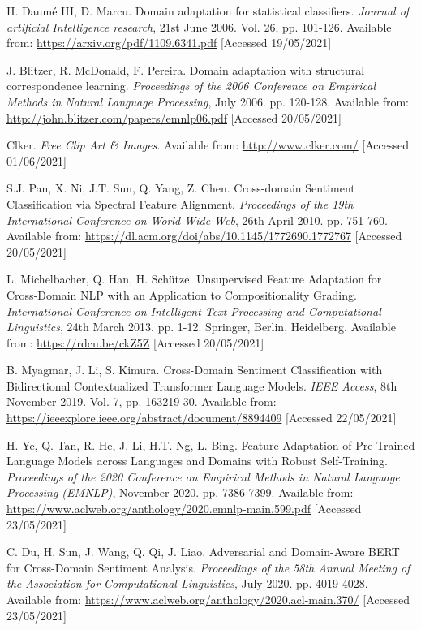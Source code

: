 \begin{thebibliography}{9}
H. Daumé III, D. Marcu. Domain adaptation for statistical classifiers. \textit{Journal of artificial Intelligence research}, 21st June 2006. Vol. 26, pp. 101-126. Available from: \url{https://arxiv.org/pdf/1109.6341.pdf} [Accessed 19/05/2021]

J. Blitzer, R. McDonald, F. Pereira. Domain adaptation with structural correspondence learning. \textit{Proceedings of the 2006 Conference on Empirical Methods in Natural Language Processing}, July 2006. pp. 120-128. Available from: \url{http://john.blitzer.com/papers/emnlp06.pdf} [Accessed 20/05/2021]

Clker. \textit{Free Clip Art \& Images}. Available from: \url{http://www.clker.com/} [Accessed 01/06/2021]

S.J. Pan, X. Ni, J.T. Sun, Q. Yang, Z. Chen. Cross-domain Sentiment Classification via Spectral Feature Alignment. \textit{Proceedings of the 19th International Conference on World Wide Web}, 26th April 2010. pp. 751-760. Available from: \url{https://dl.acm.org/doi/abs/10.1145/1772690.1772767} [Accessed 20/05/2021]

L. Michelbacher, Q. Han, H. Schütze. Unsupervised Feature Adaptation for Cross-Domain NLP with an Application to Compositionality Grading. \textit{International Conference on Intelligent Text Processing and Computational Linguistics}, 24th March 2013. pp. 1-12. Springer, Berlin, Heidelberg. Available from: \url{https://rdcu.be/ckZ5Z} [Accessed 20/05/2021]

B. Myagmar, J. Li, S. Kimura. Cross-Domain Sentiment Classification with Bidirectional Contextualized Transformer Language Models. \textit{IEEE Access}, 8th November 2019. Vol. 7, pp. 163219-30. Available from: \url{https://ieeexplore.ieee.org/abstract/document/8894409} [Accessed 22/05/2021]

H. Ye, Q. Tan, R. He, J. Li, H.T. Ng, L. Bing. Feature Adaptation of Pre-Trained Language Models across Languages and Domains with Robust Self-Training. \textit{Proceedings of the 2020 Conference on Empirical Methods in Natural Language Processing (EMNLP)}, November 2020. pp. 7386-7399. Available from: \url{https://www.aclweb.org/anthology/2020.emnlp-main.599.pdf} [Accessed 23/05/2021]

C. Du, H. Sun, J. Wang, Q. Qi, J. Liao. Adversarial and Domain-Aware BERT for Cross-Domain Sentiment Analysis. \textit{Proceedings of the 58th Annual Meeting of the Association for Computational Linguistics}, July 2020. pp. 4019-4028. Available from: \url{https://www.aclweb.org/anthology/2020.acl-main.370/} [Accessed 23/05/2021]


\end{thebibliography}
